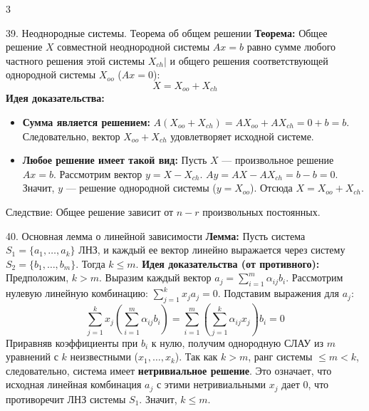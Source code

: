 \documentclass[8pt, a4paper, landscape]{extarticle}
\begin{document}
\begin{multicols*}{3}
\begin{ticket}{39. Неоднородные системы. Теорема об общем решении}
	\textbf{Теорема:} Общее решение $X$ совместной неоднородной системы $Ax = b$ равно сумме любого частного решения этой системы $X_{ch}|$ и общего решения соответствующей однородной системы $X_{oo}$ ($Ax=0$):
	\[X = X_{oo} + X_{ch}\]
\tcblower
\textbf{Идея доказательства:} 
\begin{itemize}
	\item \textbf{Сумма является решением:} $A(X_{oo} + X_{ch}) = AX_{oo} + AX_{ch} = 0 + b = b$. Следовательно, вектор $X_{oo} + X_{ch}$ удовлетворяет исходной системе.
	\item \textbf{Любое решение имеет такой вид:} Пусть $X$ --- произвольное решение $Ax=b$. Рассмотрим вектор $y = X - X_{ch}$. $Ay = AX - AX_{ch} = b - b = 0$. Значит, $y$ --- решение однородной системы ($y = X_{oo}$). Отсюда $X = X_{oo} + X_{ch}$.
\end{itemize}
Следствие: Общее решение зависит от $n-r$ произвольных постоянных.
\end{ticket}

\begin{ticket}{40. Основная лемма о линейной зависимости}
\textbf{Лемма:} Пусть система $S_1 = \{a_1, \dots, a_k\}$ ЛНЗ, и каждый ее вектор линейно выражается через систему $S_2 = \{b_1, \dots, b_m\}$. Тогда $k \le m$.
\textbf{Идея доказательства (от противного):} 
Предположим, $k > m$. Выразим каждый вектор $a_j = \sum_{i=1}^m \alpha_{ij} b_i$. 
Рассмотрим нулевую линейную комбинацию: $\sum_{j=1}^k x_j a_j = 0$.
\tcblower
Подставим выражения для $a_j$:
\[\sum_{j=1}^k x_j \left( \sum_{i=1}^m \alpha_{ij}b_i \right) = \sum_{i=1}^m \left( \sum_{j=1}^k \alpha_{ij}x_j \right) b_i = 0\]
Приравняв коэффициенты при $b_i$ к нулю, получим однородную СЛАУ из $m$ уравнений с $k$ неизвестными ($x_1, \dots, x_k$).
Так как $k > m$, ранг системы $\le m < k$, следовательно, система имеет \textbf{нетривиальное решение}.
Это означает, что исходная линейная комбинация $a_j$ с этими нетривиальными $x_j$ дает $0$, что противоречит ЛНЗ системы $S_1$. Значит, $k \le m$.
\end{ticket}

\end{multicols*}
\end{document}
